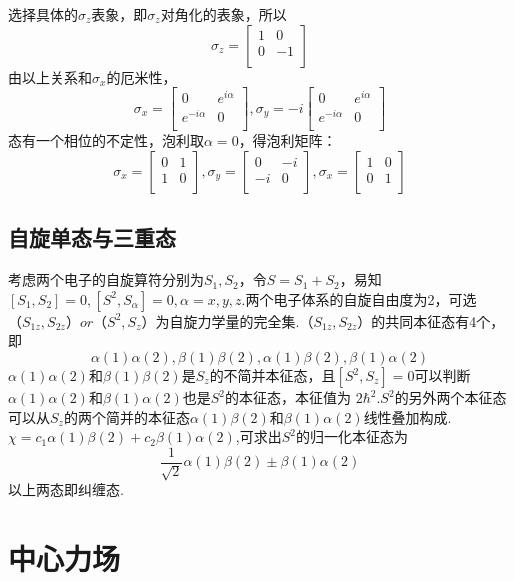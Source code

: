 \documentclass[13pt,a4paper]{article}
\begin{document}
\begin{CJK}{UTF8}{song}
选择具体的$\sigma_z$表象，即$\sigma_z$对角化的表象，所以$$\sigma_z=\begin{bmatrix}
	1 & 0\\
	0& -1\\
\end{bmatrix}$$
由以上关系和$\sigma_x$的厄米性，$$\sigma_x=\begin{bmatrix}
	0& e^{i\alpha}\\
	e^{-i\alpha}& 0\\
\end{bmatrix}, 
\sigma_y=-i\begin{bmatrix}
	0& e^{i\alpha}\\
	e^{-i\alpha}& 0\\
\end{bmatrix}$$
态有一个相位的不定性，泡利取$\alpha=0$，得泡利矩阵：$$\sigma_x=\begin{bmatrix}
	0& 1\\
	1& 0\\
\end{bmatrix},
\sigma_y=\begin{bmatrix}
	0& -i\\
	-i& 0\\
\end{bmatrix},
\sigma_x=\begin{bmatrix}
	1& 0\\
	0& 1\\
\end{bmatrix}$$


\subsection{自旋单态与三重态}
考虑两个电子的自旋算符分别为$S_1,S_2$，令$S=S_1+S_2$，易知$[S_1,S_2]=0,[S^2,S_\alpha]=0,\alpha=x,y,z.$两个电子体系的自旋自由度为2，可选$（S_{1z},S_{2z}）or （S^2,S_z）$为自旋力学量的完全集.$（S_{1z},S_{2z}）$的共同本征态有4个，即$$\alpha(1)\alpha(2),\beta(1)\beta(2),\alpha(1)\beta(2),\beta(1)\alpha(2)$$
$\alpha(1)\alpha(2)$和$\beta(1)\beta(2)$是$S_z$的不简并本征态，且$[S^2,S_z]=0$可以判断$\alpha(1)\alpha(2)$和$\beta(1)\alpha(2)$也是$S^2$的本征态，本征值为 $2\hbar^2$.$S^2$的另外两个本征态可以从$S_z$的两个简并的本征态$\alpha(1)\beta(2)$和$\beta(1)\alpha(2)$线性叠加构成.$\chi=c_1\alpha(1)\beta(2)+c_2\beta(1)\alpha(2)$,可求出$S^2$的归一化本征态为$$\frac{1}{\sqrt{2}}\alpha(1)\beta(2)\pm\beta(1)\alpha(2)$$
以上两态即纠缠态.



\section{中心力场}

\end{CJK}
\end{document}

